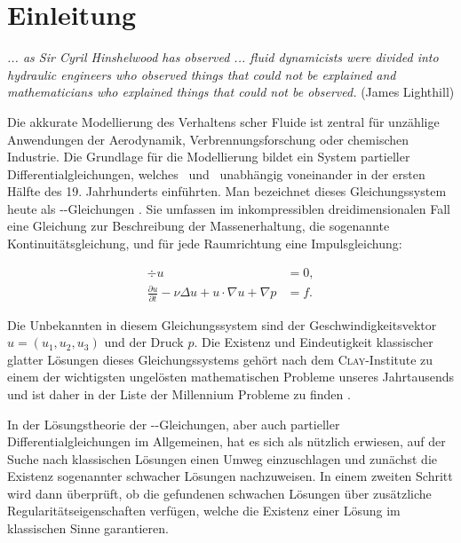 \chapter*{Einleitung}

\begin{addmargin}[2em]{2em}%
  \textit{... as Sir Cyril Hinshelwood has observed ... fluid dynamicists
were divided into hydraulic engineers who observed things that
could not be explained and mathematicians who explained things
that could not be observed.} 
  \flushright(James Lighthill)
\end{addmargin}
\vspace{1.5cm}

Die akkurate Modellierung des Verhaltens \newton scher Fluide ist zentral für unzählige Anwendungen der Aerodynamik, Verbrennungsforschung oder chemischen Industrie.
Die Grundlage für die Modellierung bildet ein System partieller Differentialgleichungen, welches \navier\ und \stokes\ unabhängig voneinander in der ersten Hälfte des 19. Jahrhunderts einführten. 
Man bezeichnet dieses Gleichungssystem heute als \navier\hyp\stokes\hyp{}Gleichungen \cite[S.103ff.]{spurk10stroemungslehre}.
Sie umfassen im inkompressiblen dreidimensionalen Fall eine Gleichung zur Beschreibung der Massenerhaltung, die sogenannte Kontinuitätsgleichung, und für jede Raumrichtung eine Impulsgleichung:

\begin{align*}
  \div u &= 0, \\
  \frac{\partial u}{\partial t} - \nu \Delta u + u \cdot \nabla u + \nabla p &= f.
\end{align*}

Die Unbekannten in diesem Gleichungssystem sind der Geschwindigkeitsvektor $u = (u_1, u_2, u_3)$ und der Druck $p$.
Die Existenz und Eindeutigkeit klassischer glatter Lösungen dieses Gleichungssystems gehört nach dem \textsc{Clay}\hyp{}Institute zu einem der wichtigsten ungelösten mathematischen Probleme unseres Jahrtausends und ist daher in der Liste der Millennium Probleme zu finden \cite{clay}.

In der Lösungstheorie der \navier\hyp\stokes\hyp{}Gleichungen, aber auch partieller Differentialgleichungen im Allgemeinen, hat es sich als nützlich erwiesen, auf der Suche nach klassischen Lösungen einen Umweg einzuschlagen und zunächst die Existenz sogenannter schwacher Lösungen nachzuweisen.
In einem zweiten Schritt wird dann überprüft, ob die gefundenen schwachen Lösungen über zusätzliche Regularitätseigenschaften verfügen, welche die Existenz einer Lösung im klassischen Sinne garantieren.

